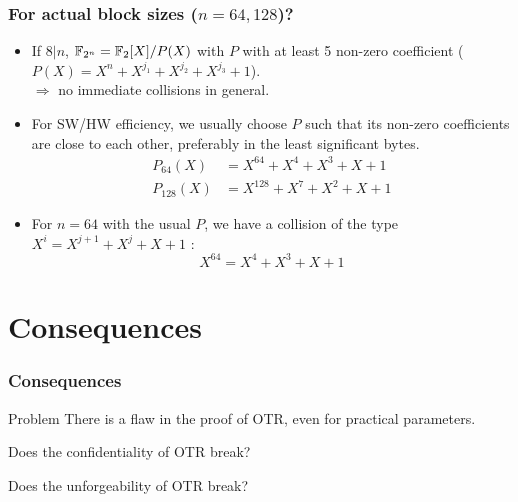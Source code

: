 \documentclass{beamer}
\begin{document}
	\begin{frame}
		\frametitle{For actual block sizes ($n = 64, 128$)?}

		\begin{itemize}
			\item If $8 | n$, $\mathbb{F}_{2^n} = \mathbb{F}_2[X]/P(X)$ with $P$ with at least 5 non-zero coefficient ($P(X) = X^n + X^{j_1} + X^{j_2} + X^{j_3} +1$).
			\\ \tab $\Rightarrow$ no immediate collisions in general.
			
			\item<2-> For SW/HW efficiency, we usually choose $P$ such that its non-zero coefficients are close to each other, preferably in the least significant bytes.
			\begin{align*}
				P_{64}(X) &= X^{64}+X^4+X^3+X+1 \\
				P_{128}(X) &= X^{128}+X^{7}+X^{2}+X+1
			\end{align*}
			
			\item<3-> For $n = 64$ with the usual $P$, we have a collision of the type $X^i = X^{j+1} + X^j + X + 1$ :
			 \[
			 X^{64} = X^4+X^3+X+1
			 \]
		\end{itemize}
		
	\end{frame}



\section{Consequences} %
\label{sec:consequences}

	\begin{frame}
		\frametitle{Consequences}

		\begin{alertblock}{Problem}
There is a flaw in the proof of OTR, even for practical parameters.
		\end{alertblock}

\vspace{0.4cm}

Does the confidentiality of OTR break?

Does the unforgeability of OTR break?


		
	\end{frame}
\end{document}
